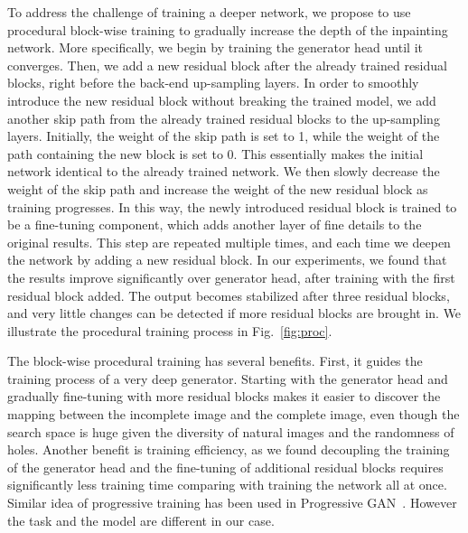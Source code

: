 To address the challenge of training a deeper network, we propose to use procedural block-wise training to gradually increase the depth of the inpainting network. More specifically, we begin by training the generator head until it converges. Then, we add a new residual block after the already trained residual blocks, right before the back-end up-sampling layers. In order to smoothly introduce the new residual block without breaking the trained model, we add another skip path from the already trained residual blocks to the up-sampling layers. Initially, the weight of the skip path is set to 1, while the weight of the path containing the new block is set to 0. This essentially makes the initial network identical to the already trained network. We then slowly decrease the weight of the skip path and increase the weight of the new residual block as training progresses. In this way, the newly introduced residual block is trained to be a fine-tuning component, which adds another layer of fine details to the original results. This step are repeated multiple times, and each time we deepen the network by adding a new residual block. In our experiments, we found that the results improve significantly over generator head, after training with the first residual block added. The output becomes stabilized after three residual blocks, and very little changes can be detected if more residual blocks are brought in. We illustrate the procedural training process in Fig.~\ref{fig:proc}.

The block-wise procedural training has several benefits. First, it guides the training process of a very deep generator. Starting with the generator head and gradually fine-tuning with more residual blocks makes it easier to discover the mapping between the incomplete image and the complete image, even though the search space is huge given the diversity of natural images and the randomness of holes. Another benefit is training efficiency, as we found decoupling the training of the generator head and the fine-tuning of additional residual blocks requires significantly less training time comparing with training the network all at once. Similar idea of progressive training has been used in Progressive GAN~\cite{karras2017progressive}. However the task and the model are different in our case.


